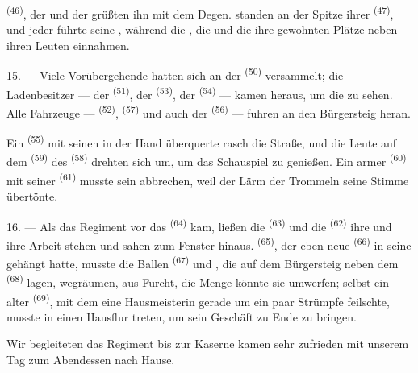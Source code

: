  \textsuperscript{(46)}, der  und der
 grüßten ihn mit dem Degen.  standen an
der Spitze ihrer  \textsuperscript{(47)}, und jeder
 führte seine , während die ,
die  und die  ihre gewohnten Plätze neben
ihren Leuten einnahmen.

15. --- Viele Vorübergehende hatten sich an der 
\textsuperscript{(50)} versammelt; die Ladenbesitzer --- der 
\textsuperscript{(51)}, der  \textsuperscript{(53)}, der
 \textsuperscript{(54)} --- kamen heraus, um die
 zu sehen. Alle Fahrzeuge --- 
\textsuperscript{(52)},  \textsuperscript{(57)} und auch der
 \textsuperscript{(56)} --- fuhren an den Bürgersteig heran.

\VUsaut{3.0mm}

Ein  \textsuperscript{(55)} mit seinen
 in der Hand überquerte rasch die Straße, und die Leute auf
dem  \textsuperscript{(59)} des 
\textsuperscript{(58)} drehten sich um, um das Schauspiel zu genießen. Ein armer
 \textsuperscript{(60)} mit seiner 
\textsuperscript{(61)} musste sein  abbrechen, weil der Lärm der Trommeln
seine Stimme übertönte.

16. --- Als das Regiment vor das  \textsuperscript{(64)} kam,
ließen die  \textsuperscript{(63)} und die 
\textsuperscript{(62)} ihre  und ihre Arbeit stehen und sahen
zum Fenster hinaus.  \textsuperscript{(65)}, der eben neue
 \textsuperscript{(66)} in seine  gehängt hatte, musste
die Ballen  \textsuperscript{(67)} und , die auf dem
Bürgersteig neben dem  \textsuperscript{(68)} lagen, wegräumen, aus
Furcht, die Menge könnte sie umwerfen; selbst ein alter 
\textsuperscript{(69)}, mit dem eine Hausmeisterin gerade um ein paar Strümpfe
feilschte, musste in einen Hausflur treten, um sein Geschäft zu Ende zu bringen.

Wir begleiteten das Regiment bis zur Kaserne  kamen sehr zufrieden mit
unserem Tag zum Abendessen nach Hause.

